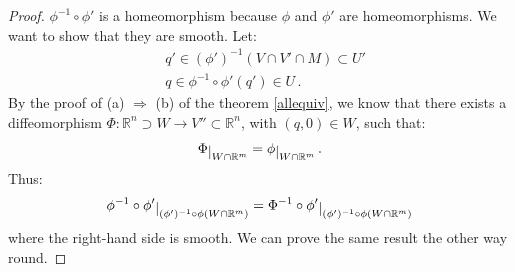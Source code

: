 \documentclass[a4paper,11pt,titlepage, article, oneside]{memoir}
\numberwithin{equation}{section}
\theoremstyle{definition}
\theoremstyle{remark}
\newcommand{\rfield}{\mathbb{R}}
\newcommand{\restrict}[2]{{#1}\raisebox{-.5ex}{$|$}_{#2}}
\begin{document}
\begin{proof}
$\phi^{-1} \circ \phi'$ is a homeomorphism because $\phi$ and $\phi'$ are homeomorphisms. We want to show that they are smooth. Let:
\begin{align*}
&q' \in (\phi')^{-1}(V \cap V' \cap M) \subset U' \\
&q \in \phi^{-1} \circ \phi' (q') \in U \, .
\end{align*}
By the proof of (a) $\Rightarrow$ (b) of the theorem \ref{allequiv}, we know that there exists a diffeomorphism $\Phi \colon \rfield^n \supset W \rightarrow V'' \subset \rfield^n$, with $(q, 0) \in W$, such that:
\[ \restrict{\Phi}{W \cap \rfield^m} = \restrict{\phi}{W \cap \rfield^m} \, . \]
Thus:
\[\restrict{\phi^{-1} \circ \phi'}{(\phi')^{-1} \circ \phi(W \cap \rfield^m)} = \restrict{\Phi^{-1} \circ \phi'}{(\phi')^{-1} \circ \phi(W \cap \rfield^m)} \]
where the right-hand side is smooth. We can prove the same result the other way round.
\end{proof}
\end{document}
